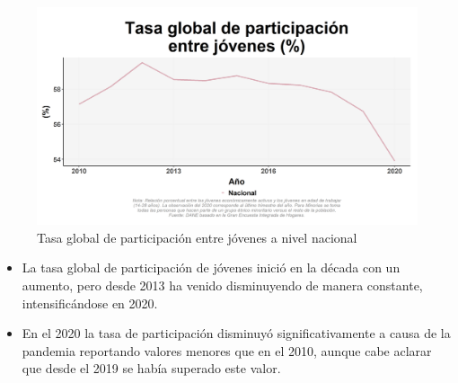     \begin{figure}[H]
        \caption{Tasa global de participación entre jóvenes a nivel nacional \label{map_result_2} }
        \begin{center}
        \includegraphics[width=\textwidth,keepaspectratio]{img/var_86_trend.png}
        \end{center}
    \end{figure}
            \begin{itemize}
                \item La tasa global de participación de jóvenes inició en la década con un aumento, pero desde 2013 ha venido disminuyendo de manera constante, intensificándose en 2020.
                \item En el 2020 la tasa de participación disminuyó significativamente a causa de la pandemia reportando valores menores que en el 2010, aunque cabe aclarar que desde el 2019 se había superado este valor.
                \end{itemize}


